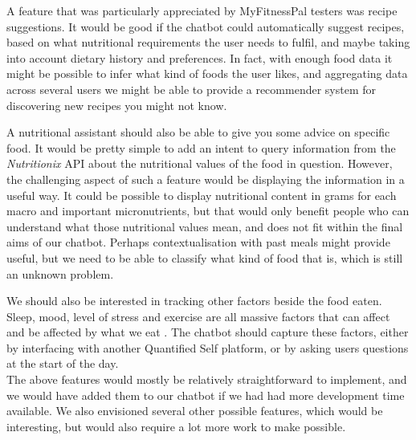 A feature that was particularly appreciated by MyFitnessPal testers was recipe suggestions. It would be good if the chatbot could automatically suggest recipes, based on what nutritional requirements the user needs to fulfil, and maybe taking into account dietary history and preferences. In fact, with enough food data it might be possible to infer what kind of foods the user likes, and aggregating data across several users we might be able to provide a recommender system for discovering new recipes you might not know. 

A nutritional assistant should also be able to give you some advice on specific food. It would be pretty simple to add an intent to query information from the \textit{Nutritionix} API about the nutritional values of the food in question. However, the challenging aspect of such a feature would be displaying the information in a useful way. It could be possible to display nutritional content in grams for each macro and important micronutrients, but that would only benefit people who can understand what those nutritional values mean, and does not fit within the final aims of our chatbot. Perhaps contextualisation with past meals might provide useful, but we need to be able to classify what kind of food that is, which is still an unknown problem.

We should also be interested in tracking other factors beside the food eaten. Sleep, mood, level of stress and exercise are all massive factors that can affect and be affected by what we eat \cite{buman2015physical}. The chatbot should capture these factors, either by interfacing with another Quantified Self platform, or by asking users questions at the start of the day. \\
The above features would mostly be relatively straightforward to implement, and we would have added them to our chatbot if we had had more development time available. We also envisioned several other possible features, which would be interesting, but would also require a lot more work to make possible.

